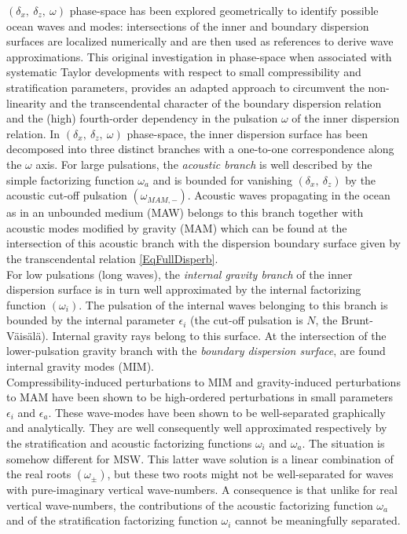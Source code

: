 \documentclass[a4paper,11pt]{article}
\begin{document}
$(\delta_x,\ \delta_z,\ \omega)$ phase-space has been explored geometrically to identify possible ocean waves and modes: intersections of the inner and boundary dispersion surfaces are localized numerically and are then used as references to derive wave approximations. This original investigation in phase-space when associated with systematic Taylor developments with respect to small compressibility and stratification parameters, provides an adapted approach to circumvent the non-linearity and the transcendental character of the boundary dispersion relation and the (high) fourth-order dependency in the pulsation $\omega$ of the inner dispersion relation. In $(\delta_x,\ \delta_z,\ \omega)$ phase-space, the inner dispersion surface has been decomposed into three distinct branches with a one-to-one correspondence along the $\omega$ axis. For large pulsations, the \textit{acoustic branch} is well described by the simple factorizing function $\omega_a$ and is bounded for vanishing $(\delta_x,\ \delta_z)$ by the acoustic cut-off pulsation $(\omega_{MAM,-})$. Acoustic waves propagating in the ocean as in an unbounded medium (MAW) belongs to this branch together with acoustic modes modified by gravity (MAM) which can be found at the intersection of this acoustic branch with the dispersion boundary surface given by the transcendental relation \ref{EqFullDisperb}.\\
For low pulsations (long waves), the \textit{internal gravity branch} of the inner dispersion surface is in turn well approximated by the internal factorizing function $(\omega_i)$. The pulsation of the internal waves belonging to this branch is bounded by the internal parameter $\epsilon_i$ (the cut-off pulsation is $N$, the Brunt-Väisälä). Internal gravity rays belong to this surface. At the intersection of the lower-pulsation gravity branch with the \textit{boundary dispersion surface}, are found internal gravity modes (MIM).\\
Compressibility-induced perturbations to MIM and gravity-induced perturbations to MAM have been shown to be high-ordered perturbations in small parameters $\epsilon_i$ and $\epsilon_a$. These wave-modes have been shown to be well-separated graphically and analytically. They are well consequently well approximated respectively by the stratification and acoustic factorizing functions $\omega_i$ and $\omega_a$. The situation is somehow different for MSW. This latter wave solution is a linear combination of the real roots $(\omega_\pm)$, but these two roots might not be well-separated for waves with pure-imaginary vertical wave-numbers. A consequence is that unlike for real vertical wave-numbers, the contributions of the acoustic factorizing function $\omega_a$ and of the stratification factorizing function $\omega_i$ cannot be meaningfully separated.\\
\end{document}
